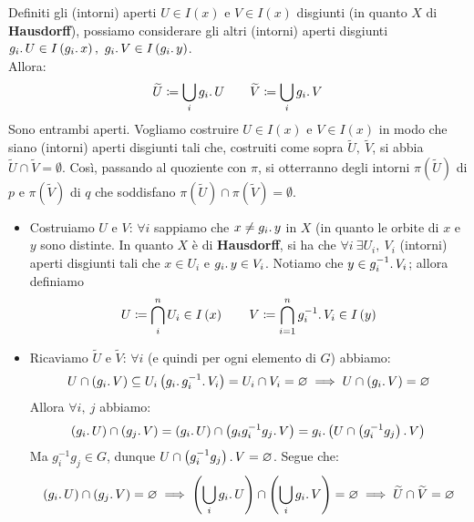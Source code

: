 \begin{demonstration}
\begin{enumerate}[label=\Roman*]
Definiti gli (intorni) aperti $U\in I\left(x\right)$ e $V\in I\left(x\right)$ disgiunti (in quanto $X$ di \textbf{Hausdorff}), possiamo considerare gli altri (intorni) aperti disgiunti $g_i\ldotp U\in I\left(g_i\ldotp x\right),\ g_i\ldotp V\in I\left(g_i\ldotp y\right)$.\\
Allora:
\begin{equation}
\widetilde{U}\coloneqq \union_{i}g_i\ldotp U\qquad \widetilde{V}\coloneqq \union_{i}g_i\ldotp V
\end{equation}
Sono entrambi aperti. Vogliamo costruire $U\in I\left(x\right)$ e $V\in I\left(x\right)$ in modo che siano (intorni) aperti disgiunti tali che, costruiti come sopra $\widetilde{U},\ \widetilde{V}$, si abbia $\widetilde{U}\cap \widetilde{V}=\emptyset$. Così, passando al quoziente con $\pi$, si otterranno degli intorni $\pi\left(\widetilde{U}\right)$ di $p$ e $\pi\left(\widetilde{V}\right)$ di $q$ che soddisfano $\pi\left(\widetilde{U}\right)\cap \pi\left(\widetilde{V}\right)=\emptyset$.\\
\begin{itemize}
\item Costruiamo $U$ e $V$: $\forall i$ sappiamo che $x\neq g_i\ldotp y$ in $X$ (in quanto le orbite di $x$ e $y$ sono distinte. In quanto $X$ è di \textbf{Hausdorff}, si ha che $\forall i\ \exists U_i,\ V_i$ (intorni) aperti disgiunti tali che $x\in U_i$ e $g_i\ldotp y\in V_i$. Notiamo che $y\in g_i^{-1}\ldotp V_i$; allora definiamo
\begin{equation*}
U\coloneqq \inter_{i}^{n}U_i\in I\left(x\right)\qquad V\coloneqq \inter_{i=1}^{n}g_i^{-1}\ldotp V_i\in I\left(y\right)
\end{equation*}
\item Ricaviamo $\widetilde{U}$ e $\widetilde{V}$: $\forall i$ (e quindi per ogni elemento di $G$) abbiamo:
\begin{equation*}
U\cap \left(g_i\ldotp V\right)\subseteq U_i\left(g_i\ldotp g_i^{-1}\ldotp V_i\right)=U_i\cap V_i=\emptyset\implies U\cap \left(g_i\ldotp V\right)=\emptyset
\end{equation*}
Allora $\forall i,\ j$ abbiamo:
\begin{equation*}
	\left(g_i\ldotp U\right)\cap \left(g_j\ldotp V\right)=\left(g_i\ldotp U\right)\cap \left(g_ig_i^{-1}g_j\ldotp V\right)= g_i\ldotp \left(U\cap \left(g_i^{-1}g_j\right)\ldotp V\right)
\end{equation*}
Ma $g_i^{-1}g_j \in G$, dunque $U\cap \left(g_i^{-1}g_j\right)\ldotp V=\emptyset$. Segue che:
\begin{equation*}
	\left(g_i\ldotp U\right)\cap \left(g_j\ldotp V\right)=\emptyset\implies
	\left(\union_{i}g_i\ldotp U\right)\cap \left(\union_{i}g_i\ldotp V\right)=\emptyset\implies \widetilde{U}\cap \widetilde{V}=\emptyset
\end{equation*}	
\end{itemize}
\end{enumerate}
\end{demonstration}
